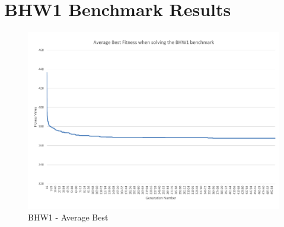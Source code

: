 


\chapter{BHW1 Benchmark Results} %
\label{cha:bhw1_benchmark_results}

\begin{landscape}
\begin{figure}[thbp]
	\centerline{\includegraphics[height=0.945\textwidth]{figures/BHW1_graphs/BHW1_average_best.pdf}}
	\caption{BHW1 - Average Best}
	\label{fig:bhw1ab}
\end{figure}
\end{landscape}

